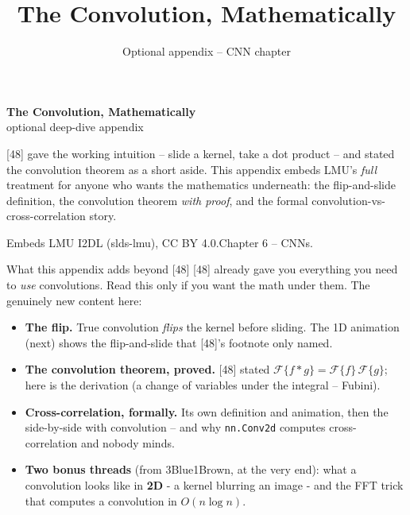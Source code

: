 \documentclass[aspectratio=43]{beamer}
\title{The Convolution, Mathematically}
\subtitle{Optional appendix -- CNN chapter}
\date{}
\begin{document}
\begin{frame}[plain]
  \vfill
  \begin{center}
    {\Large\color{popblue}\textbf{The Convolution, Mathematically}}\\[0.4em]
    {\normalsize\color{gray} optional deep-dive appendix}\\[0.9em]
    \begin{minipage}{0.86\textwidth}\centering\small
      [48] gave the working intuition -- slide a kernel, take a dot product -- and stated the
      convolution theorem as a short aside. This appendix embeds LMU's \emph{full} treatment
      for anyone who wants the mathematics underneath: the flip-and-slide definition, the
      convolution theorem \emph{with proof}, and the formal
      convolution-vs-cross-correlation story.
    \end{minipage}
  \end{center}
  \vfill
  {\scriptsize\color{gray} Embeds LMU I2DL (slds-lmu), CC BY 4.0.\quad Chapter 6 -- CNNs.}
\end{frame}

\begin{frame}{What this appendix adds beyond [48]}
  [48] already gave you everything you need to \emph{use} convolutions. Read this only if you
  want the math under them. The genuinely new content here:
  \vfill
  \begin{itemize}\small
    \item \textbf{The flip.} True convolution \emph{flips} the kernel before sliding. The 1D
      animation (next) shows the flip-and-slide that [48]'s footnote only named.
    \item \textbf{The convolution theorem, proved.} [48] stated
      $\mathcal{F}\{f \ast g\} = \mathcal{F}\{f\}\,\mathcal{F}\{g\}$; here is the derivation
      (a change of variables under the integral -- Fubini).
    \item \textbf{Cross-correlation, formally.} Its own definition and animation, then the
      side-by-side with convolution -- and why \texttt{nn.Conv2d} computes cross-correlation
      and nobody minds.
    \item \textbf{Two bonus threads} (from 3Blue1Brown, at the very end): what a convolution
      looks like in \textbf{2D} - a kernel blurring an image - and the FFT trick that
      computes a convolution in $O(n\log n)$.
  \end{itemize}
  \vfill
\end{frame}
\end{document}
